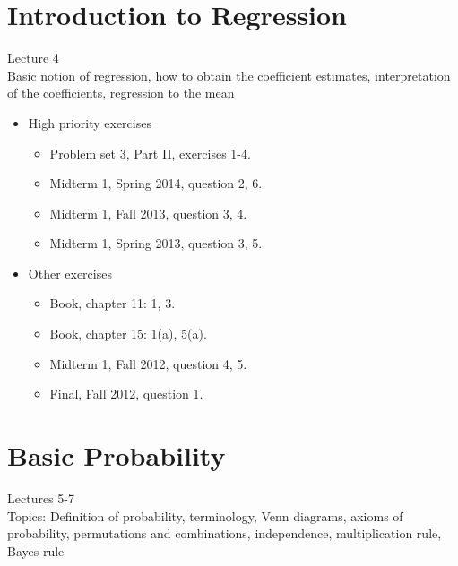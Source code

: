 \documentclass[11pt]{article}
\begin{document}
\section{Introduction to Regression}
Lecture 4 \\[0.2in]
Basic notion of regression, how to obtain the coefficient estimates, interpretation of the coefficients, regression to the mean
\begin{itemize}
\item High priority exercises
	\begin{itemize}
		\item Problem set 3, Part II, exercises 1-4.
		\item Midterm 1, Spring 2014, question 2, 6.
		\item Midterm 1, Fall 2013, question 3, 4.
		\item Midterm 1, Spring 2013, question 3, 5.
	\end{itemize}
\item Other exercises
	\begin{itemize}
		\item Book, chapter 11: 1, 3.
		\item Book, chapter 15: 1(a), 5(a).
		\item Midterm 1, Fall 2012, question 4, 5.
		\item Final, Fall 2012, question 1.
	\end{itemize}
\end{itemize}



\section{Basic Probability} 
Lectures 5-7\\[0.2in]
Topics: Definition of probability, terminology, Venn diagrams, axioms of probability, permutations and combinations, independence, multiplication rule, Bayes rule
\end{document}
